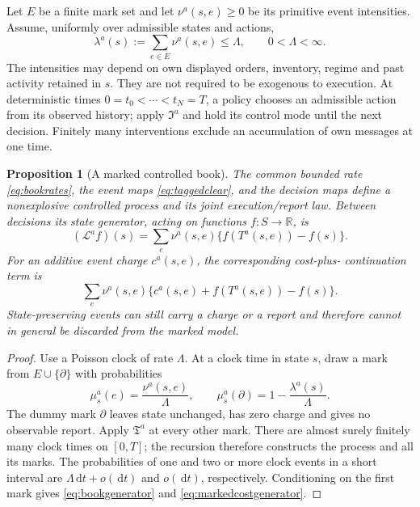 \documentclass[11pt]{article}
\numberwithin{equation}{section}
\newtheorem{proposition}[theorem]{Proposition}
\theoremstyle{definition}
\theoremstyle{remark}
\newcommand{\R}{\mathbb{R}}
\theoremstyle{definition}
\newcommand{\dd}{\,\mathrm d}
\begin{document}
Let $E$ be a finite mark set and let $\nu^a(s,e)\ge0$ be its primitive
event intensities. Assume, uniformly over admissible states and actions,
\begin{equation}\label{eq:bookrates}
 \lambda^a(s):=\sum_{e\in E}\nu^a(s,e)\le\Lambda,
 \qquad 0<\Lambda<\infty.
\end{equation}
The intensities may depend on own displayed orders, inventory, regime and
past activity retained in $s$. They are not required to be exogenous to
execution. At deterministic times $0=t_0<\cdots<t_N=T$, a policy chooses
an admissible action from its observed history; apply $\mathfrak I^a$ and
hold its control mode until the next decision. Finitely many interventions
exclude an accumulation of own messages at one time.

\begin{proposition}[A marked controlled book]\label{prop:bookgenerator}
The common bounded rate \eqref{eq:bookrates}, the event maps
\eqref{eq:taggedclear}, and the decision maps define a nonexplosive controlled
process and its joint execution/report law. Between decisions its state
generator, acting on functions $f:S\to\R$, is
\begin{equation}\label{eq:bookgenerator}
 (\mathscr L^a f)(s)=
 \sum_e\nu^a(s,e)\{f(T^a(s,e))-f(s)\}.
\end{equation}
For an additive event charge $c^a(s,e)$, the corresponding cost-plus-
continuation term is
\begin{equation}\label{eq:markedcostgenerator}
 \sum_e\nu^a(s,e)
 \{c^a(s,e)+f(T^a(s,e))-f(s)\}.
\end{equation}
State-preserving events can still carry a charge or a report and therefore
cannot in general be discarded from the marked model.
\end{proposition}
\begin{proof}
Use a Poisson clock of rate $\Lambda$. At a clock time in state $s$, draw a
mark from $E\cup\{\partial\}$ with probabilities
\begin{equation}\label{eq:bookuniformization}
 \mu_s^a(e)=\frac{\nu^a(s,e)}{\Lambda},\qquad
 \mu_s^a(\partial)=1-\frac{\lambda^a(s)}{\Lambda}.
\end{equation}
The dummy mark $\partial$ leaves state unchanged, has zero charge and gives
no observable report. Apply $\mathfrak T^a$ at every other mark. There are
almost surely finitely many clock times on $[0,T]$; the recursion therefore
constructs the process and all its marks. The probabilities of one and two
or more clock events in a short interval are $\Lambda\dd t+o(\dd t)$ and
$o(\dd t)$, respectively. Conditioning on the first mark gives
\eqref{eq:bookgenerator} and \eqref{eq:markedcostgenerator}.
\end{proof}
\end{document}
